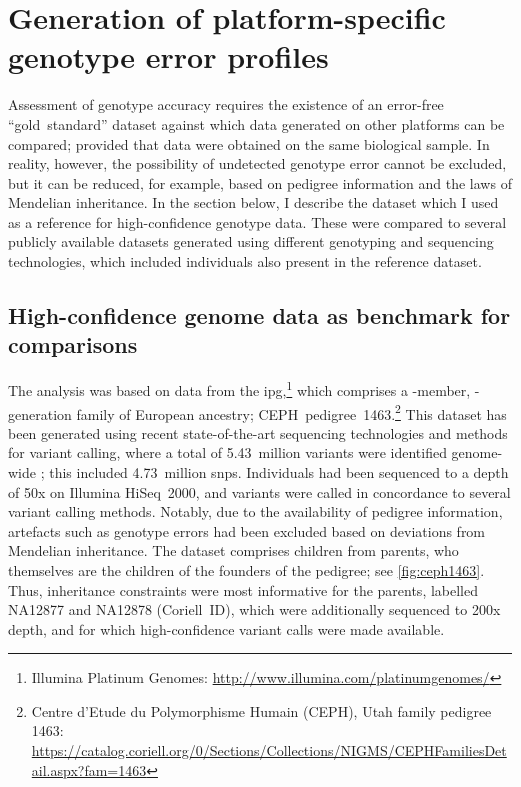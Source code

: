 %
\section{Generation of platform-specific genotype error profiles}
\label{sec:generrprofiles}
%

Assessment of genotype accuracy requires the existence of an error-free ``gold~standard'' dataset against which data generated on other platforms can be compared; provided that data were obtained on the same biological sample.
In reality, however, the possibility of undetected genotype error cannot be excluded, but it can be reduced, for example, based on pedigree information and the laws of Mendelian inheritance.
In the section below, I describe the dataset which I used as a reference for high-confidence genotype data.
These were compared to several publicly available datasets generated using different genotyping and sequencing technologies, which included individuals also present in the reference dataset.

%
\subsection{High-confidence genome data as benchmark for comparisons}
%

The analysis was based on data from the \gls{ipg},\footnote{Illumina Platinum Genomes: \url{http://www.illumina.com/platinumgenomes/} } which comprises a -member, -generation family of European ancestry; CEPH~pedigree~1463.\footnote{Centre d'Etude du Polymorphisme Humain (CEPH), Utah family pedigree 1463: \url{https://catalog.coriell.org/0/Sections/Collections/NIGMS/CEPHFamiliesDetail.aspx?fam=1463} }
This dataset has been generated using recent state-of-the-art sequencing technologies and methods for variant calling, where a total of 5.43~million variants were identified genome-wide \citep{Eberle:2016ki}; this included 4.73~million \glspl{snp}.
Individuals had been sequenced to a depth of 50x on Illumina HiSeq~2000, and variants were called in concordance to several variant calling methods.
Notably, due to the availability of pedigree information, artefacts such as genotype errors had been excluded based on deviations from Mendelian inheritance.
The dataset comprises  children from  parents, who themselves are the children of the  founders of the pedigree; see \cref{fig:ceph1463}.
Thus, inheritance constraints were most informative for the  parents, labelled \textsf{NA12877} and \textsf{NA12878} (Coriell~ID), which were additionally sequenced to 200x depth, and for which high-confidence variant calls were made available.

